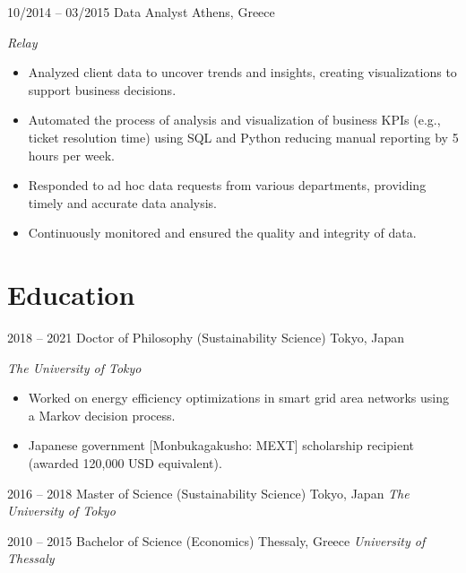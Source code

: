 \begin{entrylist}
\entry
{10/2014 -- 03/2015}
{Data Analyst}
{Athens, Greece}
{\emph{Relay}
\begin{itemize}
\item Analyzed client data to uncover trends and insights, creating visualizations to support business decisions.
\item Automated the process of analysis and visualization of business KPIs (e.g., ticket resolution time) using SQL and Python reducing manual reporting by 5 hours per week.
\item Responded to ad hoc data requests from various departments, providing timely and accurate data analysis.
\item Continuously monitored and ensured the quality and integrity of data.
\end{itemize}
}

\end{entrylist}

\section{Education}
\begin{entrylist}
\entry
{2018 -- 2021}
{Doctor of Philosophy  (Sustainability Science)}
{Tokyo, Japan}
{\emph{The University of Tokyo}
\begin{itemize}
\item Worked on energy efficiency optimizations in smart grid area networks using a Markov decision process.
\item Japanese government [Monbukagakusho: MEXT] scholarship recipient (awarded 120,000 USD equivalent).
\end{itemize}
}
\end{entrylist}
\begin{entrylist}
\entry
{2016 -- 2018}
{Master of Science (Sustainability Science)}
{Tokyo, Japan}
{\emph{The University of Tokyo}}
\end{entrylist}

\begin{entrylist}
\entry
{2010 -- 2015}
{Bachelor of Science (Economics)}
{Thessaly, Greece}
{\emph{University of Thessaly}}
\end{entrylist}



